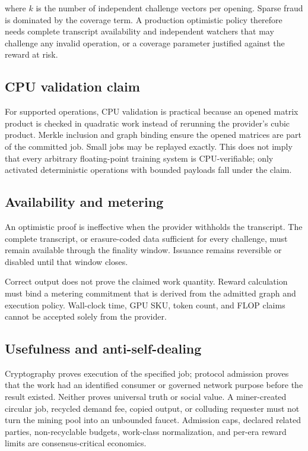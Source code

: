 where $k$ is the number of independent challenge vectors per opening. Sparse
fraud is dominated by the coverage term. A production optimistic policy
therefore needs complete transcript availability and independent watchers that
may challenge any invalid operation, or a coverage parameter justified against
the reward at risk.

\subsection{CPU validation claim}

For supported operations, CPU validation is practical because an opened matrix
product is checked in quadratic work instead of rerunning the provider's cubic
product. Merkle inclusion and graph binding ensure the opened matrices are part
of the committed job. Small jobs may be replayed exactly. This does not imply
that every arbitrary floating-point training system is CPU-verifiable; only
activated deterministic operations with bounded payloads fall under the claim.

\subsection{Availability and metering}

An optimistic proof is ineffective when the provider withholds the transcript.
The complete transcript, or erasure-coded data sufficient for every challenge,
must remain available through the finality window. Issuance remains reversible
or disabled until that window closes.

Correct output does not prove the claimed work quantity. Reward calculation must
bind a metering commitment that is derived from the admitted graph and execution
policy. Wall-clock time, GPU SKU, token count, and FLOP claims cannot be accepted
solely from the provider.

\subsection{Usefulness and anti-self-dealing}

Cryptography proves execution of the specified job; protocol admission proves
that the work had an identified consumer or governed network purpose before the
result existed. Neither proves universal truth or social value. A miner-created
circular job, recycled demand fee, copied output, or colluding requester must not
turn the mining pool into an unbounded faucet. Admission caps, declared related
parties, non-recyclable budgets, work-class normalization, and per-era reward
limits are consensus-critical economics.


